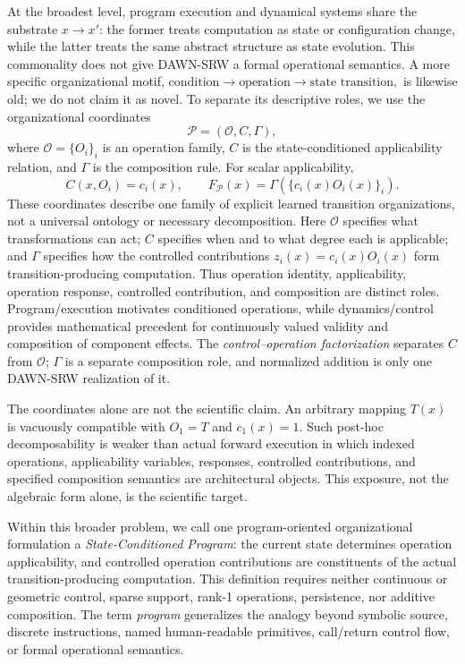 \documentclass{article}
\newcommand{\DAWN}{DAWN-SRW}
\begin{document}
At the broadest level, program execution and dynamical systems share the
substrate
\(x\longrightarrow x'\): the former treats computation as state or
configuration change, while the
latter treats the same abstract structure as state evolution. This commonality
does not give \DAWN{} a formal operational semantics. A more specific
organizational motif,
\(
\text{condition}\longrightarrow\text{operation}\longrightarrow
\text{state transition},
\)
is likewise old; we do not claim it as novel. To separate its descriptive
roles, we use the organizational coordinates
\begin{equation}
\mathcal P=(\mathcal O,C,\Gamma),
\label{eq:organizational_coordinates}
\end{equation}
where \(\mathcal O=\{O_i\}_i\) is an operation family, \(C\) is the
state-conditioned applicability relation, and \(\Gamma\) is the composition
rule. For scalar applicability,
\begin{equation}
C(x,O_i)=c_i(x),\qquad
F_{\mathcal P}(x)=\Gamma\!\left(\{c_i(x)O_i(x)\}_i\right).
\label{eq:general_composition}
\end{equation}
These coordinates describe one family of explicit learned transition
organizations, not a universal ontology or necessary decomposition. Here
\(\mathcal O\) specifies what transformations can act; \(C\) specifies when and
to what degree each is applicable; and \(\Gamma\) specifies how the controlled
contributions \(z_i(x)=c_i(x)O_i(x)\) form transition-producing computation.
Thus operation identity, applicability, operation response, controlled
contribution, and composition are distinct roles. Program/execution motivates
conditioned operations, while dynamics/control provides mathematical precedent
for continuously valued validity and composition of component effects. The
\emph{control--operation factorization} separates \(C\) from \(\mathcal O\);
\(\Gamma\) is a separate composition role, and normalized addition is only one
\DAWN{} realization of it.

The coordinates alone are not the scientific claim. An arbitrary mapping
\(T(x)\) is vacuously compatible with \(O_1=T\) and \(c_1(x)=1\). Such post-hoc
decomposability is weaker than actual forward execution in which indexed
operations, applicability variables, responses, controlled contributions, and
specified composition semantics are architectural objects. This exposure, not
the algebraic form alone, is the scientific target.

Within this broader problem, we call one program-oriented organizational
formulation a \emph{State-Conditioned Program}: the current state determines
operation applicability, and controlled operation contributions are constituents
of the actual transition-producing computation. This definition requires neither
continuous or geometric control, sparse support, rank-1 operations, persistence,
nor additive composition. The term \emph{program} generalizes the analogy beyond
symbolic source, discrete instructions, named human-readable primitives,
call/return control flow, or formal operational semantics.
\end{document}
